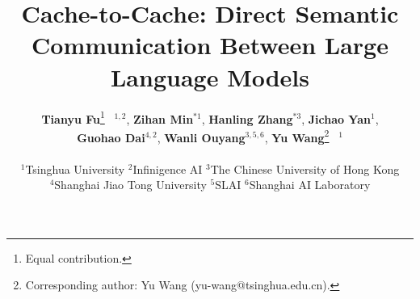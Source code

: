 \documentclass{article} %
\title{Cache-to-Cache: Direct Semantic Communication Between Large Language Models}
\author{%
    \textbf{Tianyu Fu}\thanks{Equal contribution.} \ $^{1,2}$,
    \textbf{Zihan Min}$^{* 1}$,
    \textbf{Hanling Zhang}$^{* 3}$,
    \textbf{Jichao Yan}$^{ 1}$,
    \\
    \textbf{Guohao Dai}$^{ 4,2}$,
    \textbf{Wanli Ouyang}$^{ 3,5,6}$,
    \textbf{Yu Wang}\thanks{Corresponding author: Yu Wang (yu-wang@tsinghua.edu.cn).} \ $^{1}$
    \\
    \\
    $^{1}$Tsinghua University \quad
    $^{2}$Infinigence AI \quad
    $^{3}$The Chinese University of Hong Kong
    \\
    $^{4}$Shanghai Jiao Tong University \quad
    $^{5}$SLAI \quad
    $^{6}$Shanghai AI Laboratory 
}
\begin{document}
\maketitle
\newcommand{\rebuttal}[1]{\textcolor{blue}{#1}}










\clearpage





\clearpage
\appendix

\end{document}
